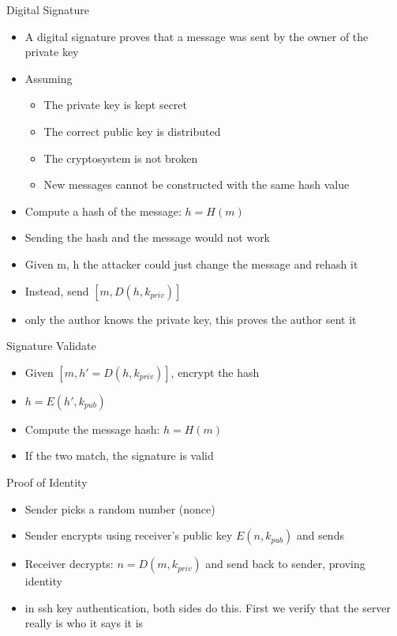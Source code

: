 \begin{withoutheadline}
\begin{frame}{Digital Signature}
    \begin{itemize}
        \item A digital signature proves that a message was sent by the owner of the private key
        \item Assuming
        \begin{itemize}
            \item The private key is kept secret
            \item The correct public key is distributed
            \item The cryptosystem is not broken
            \item New messages cannot be constructed with the same hash value
        \end{itemize}
        \item Compute a hash of the message: $h=H(m)$
        \item Sending the hash and the message would not work
        \item Given m, h the attacker could just change the message and rehash it
        \item Instead, send $[m, D(h, k_{priv})]$
        \item only the author knows the private key, this proves the author sent it
    \end{itemize}
\end{frame}

\begin{frame}{Signature Validate}
    \begin{itemize}
        \item Given $[m, h' = D(h, k_{priv})]$, encrypt the hash
        \item $h = E(h', k_{pub})$
        \item Compute the message hash: $h = H(m)$
        \item If the two match, the signature is valid
    \end{itemize}
\end{frame}

\begin{frame}{Proof of Identity}
    \begin{itemize}
        \item Sender picks a random number (nonce)
        \item Sender encrypts using receiver's public key $E(n, k_{pub})$ and sends
        \item Receiver decrypts: $n = D(m, k_{priv})$ and send back to sender, proving identity
        \item in ssh key authentication, both sides do this. First we verify that the server really is who it says it is
    \end{itemize}
\end{frame}


\end{withoutheadline}
